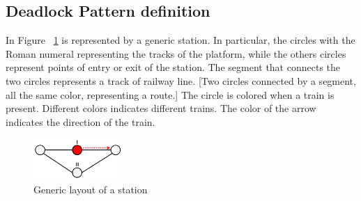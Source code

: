 \documentclass{ewic}
\begin{document}
 



\subsection{Deadlock Pattern definition}

In Figure ~\ref{fig:rappresent} is represented by a generic station.
In particular, the circles with the Roman numeral representing the tracks of the platform, while the others circles represent points of entry or exit of the station.
The segment that connects the two circles represents a track of railway line.
  [Two circles connected by a segment, all the same color, representing a route.]
The circle is colored when a train is present. Different colors indicates different trains. The color of the arrow indicates the direction of the train.

\begin{figure}[htp]
	\begin{centering}	
	\includegraphics[width=0.3\textwidth, clip]{img/rappresentazione}
	\caption{Generic layout of a station}
	\label{fig:rappresent}
	\end{centering}
\end{figure}
\end{document}
